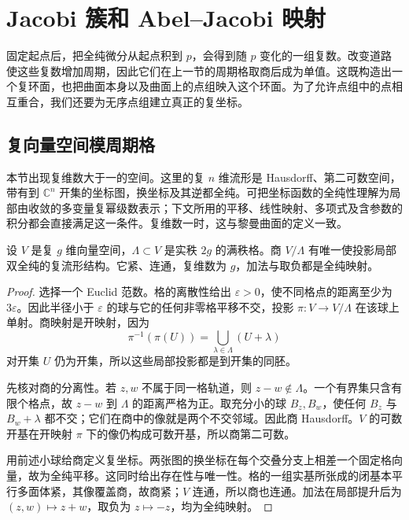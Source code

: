 
% 
% 

\section{Jacobi 簇和 Abel–Jacobi 映射}
\label{g4:sec:0402}

固定起点后，把全纯微分从起点积到 \(p\)，会得到随 \(p\) 变化的一组复数。改变道路使这些复数增加周期，因此它们在上一节的周期格取商后成为单值。这既构造出一个复环面，也把曲面本身以及曲面上的点组映入这个环面。为了允许点组中的点相互重合，我们还要为无序点组建立真正的复坐标。

\subsection{复向量空间模周期格}
\label{g4:subsec:0402:01}

本节出现复维数大于一的空间。这里的复 \(n\) 维流形是 Hausdorff、第二可数空间，带有到 \(\mathbb C^n\) 开集的坐标图，换坐标及其逆都全纯。可把坐标函数的全纯性理解为局部由收敛的多变量复幂级数表示；下文所用的平移、线性映射、多项式及含参数的积分都会直接满足这一条件。复维数一时，这与黎曼曲面的定义一致。

\begin{proposition}
	\label{g4:prop:0402:complex-torus}
	设 \(V\) 是复 \(g\) 维向量空间，\(\Lambda\subset V\) 是实秩 \(2g\) 的满秩格。商 \(V/\Lambda\) 有唯一使投影局部双全纯的复流形结构。它紧、连通，复维数为 \(g\)，加法与取负都是全纯映射。
\end{proposition}
\begin{proof}
	选择一个 Euclid 范数。格的离散性给出 \(\varepsilon>0\)，使不同格点的距离至少为 \(3\varepsilon\)。因此半径小于 \(\varepsilon\) 的球与它的任何非零格平移不交，投影 \(\pi:V\to V/\Lambda\) 在该球上单射。商映射是开映射，因为
	\[
		\pi^{-1}(\pi(U))=\bigcup_{\lambda\in\Lambda}(U+\lambda)
	\]
	对开集 \(U\) 仍为开集，所以这些局部投影都是到开集的同胚。

	先核对商的分离性。若 \(z,w\) 不属于同一格轨道，则 \(z-w\notin\Lambda\)。一个有界集只含有限个格点，故 \(z-w\) 到 \(\Lambda\) 的距离严格为正。取充分小的球 \(B_z,B_w\)，使任何 \(B_z\) 与 \(B_w+\lambda\) 都不交；它们在商中的像就是两个不交邻域。因此商 Hausdorff。\(V\) 的可数开基在开映射 \(\pi\) 下的像仍构成可数开基，所以商第二可数。

	用前述小球给商定义复坐标。两张图的换坐标在每个交叠分支上相差一个固定格向量，故为全纯平移。这同时给出存在性与唯一性。格的一组实基所张成的闭基本平行多面体紧，其像覆盖商，故商紧；\(V\) 连通，所以商也连通。加法在局部提升后为 \((z,w)\mapsto z+w\)，取负为 \(z\mapsto-z\)，均为全纯映射。
\end{proof}

